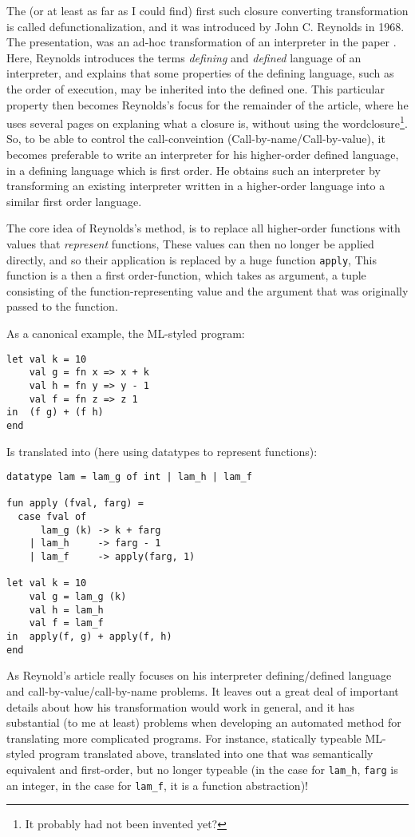 The (or at least as far as I could find) first such closure converting
transformation is called defunctionalization,
and it was introduced by John C. Reynolds in 1968.
The presentation, was an ad-hoc transformation of an interpreter in the paper
\cite{Reynolds1968}.
Here, Reynolds introduces the terms {\it defining} and {\it defined}
language of an interpreter, and explains that some properties of the
defining language, such as the order of execution,
may be inherited into the defined one.
This particular property then becomes Reynolds's focus for the remainder
of the article, where he uses several pages on explaning what a closure is,
without using the wordclosure\footnote{It probably had not been invented yet?}.
So, to be able to control the call-conveintion (Call-by-name/Call-by-value),
it becomes preferable to write an interpreter for
his higher-order defined language, in a defining language which is first order.
He obtains such an interpreter by transforming an existing interpreter
written in a higher-order language into a similar first order language.

The core idea of Reynolds's method, is to replace all higher-order
functions with values that {\it represent} functions,
These values can then no longer be applied directly,
and so their application is replaced by a huge function {\tt apply},
This function is a then a first order-function,
which takes as argument, a tuple consisting of the function-representing
value and the argument that was originally passed to the function.

As a canonical example, the ML-styled program:
\begin{verbatim}
let val k = 10
    val g = fn x => x + k
    val h = fn y => y - 1
    val f = fn z => z 1
in  (f g) + (f h)
end
\end{verbatim}

Is translated into (here using datatypes to represent functions):
\begin{verbatim}
datatype lam = lam_g of int | lam_h | lam_f

fun apply (fval, farg) =
  case fval of
      lam_g (k) -> k + farg
    | lam_h     -> farg - 1
    | lam_f     -> apply(farg, 1)

let val k = 10
    val g = lam_g (k)
    val h = lam_h
    val f = lam_f
in  apply(f, g) + apply(f, h)
end
\end{verbatim}

As Reynold's article really focuses on his interpreter
defining/defined language and call-by-value/call-by-name problems.
It leaves out a great deal of important details about how his transformation
would work in general, and it has substantial (to me at least)
problems when developing an automated method for translating more
complicated programs. For instance, statically typeable ML-styled program
translated above, translated into one that was semantically equivalent
and first-order, but no longer typeable
(in the case for {\tt lam\_h}, {\tt farg} is an integer,
 in the case for {\tt lam\_f}, it is a function abstraction)!

